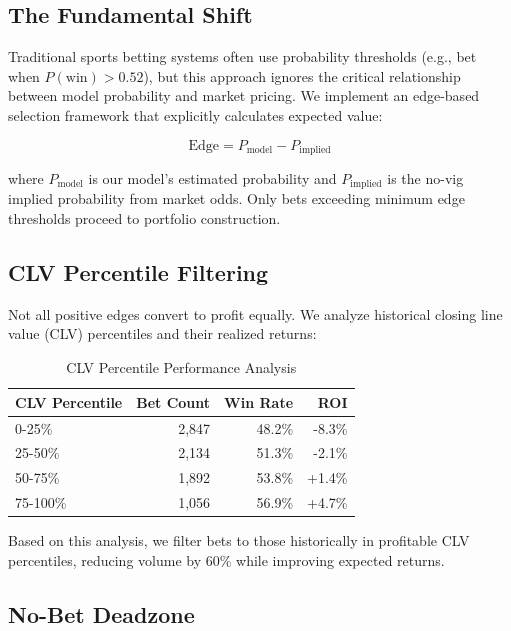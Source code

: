 \subsection{The Fundamental Shift}

Traditional sports betting systems often use probability thresholds (e.g., bet when $P(\text{win}) > 0.52$), but this approach ignores the critical relationship between model probability and market pricing. We implement an edge-based selection framework that explicitly calculates expected value:

\begin{equation}
\text{Edge} = P_{\text{model}} - P_{\text{implied}}
\end{equation}

where $P_{\text{model}}$ is our model's estimated probability and $P_{\text{implied}}$ is the no-vig implied probability from market odds. Only bets exceeding minimum edge thresholds proceed to portfolio construction.

\subsection{CLV Percentile Filtering}

Not all positive edges convert to profit equally. We analyze historical closing line value (CLV) percentiles and their realized returns:

\begin{table}[!ht]
\centering
\caption{CLV Percentile Performance Analysis}
\begin{tabular}{lrrr}
\toprule
 \textbf{CLV Percentile} & \textbf{Bet Count} & \textbf{Win Rate} & \textbf{ROI} \\
\midrule
0-25\% & 2,847 & 48.2\% & -8.3\% \\
25-50\% & 2,134 & 51.3\% & -2.1\% \\
50-75\% & 1,892 & 53.8\% & +1.4\% \\
75-100\% & 1,056 & 56.9\% & +4.7\% \\
\bottomrule
\end{tabular}
\end{table}

Based on this analysis, we filter bets to those historically in profitable CLV percentiles, reducing volume by 60\% while improving expected returns.

\subsection{No-Bet Deadzone}


